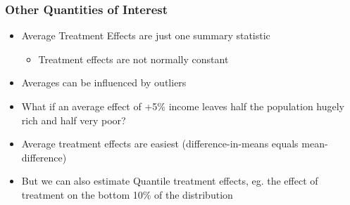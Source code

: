 \documentclass[xcolor=x11names,compress]{beamer}\usepackage[]{graphicx}\usepackage[]{color}
\renewcommand{\(}{\begin{columns}}
\renewcommand{\)}{\end{columns}}
\newcommand{\<}[1]{\begin{column}{#1}}
\renewcommand{\>}{\end{column}}
\begin{document}
\begin{frame}
\frametitle{Other Quantities of Interest}
\begin{itemize}
\item Average Treatment Effects are just one summary statistic
\begin{itemize}
\item Treatment effects are not normally constant
\end{itemize}
\pause
\item Averages can be influenced by outliers
\pause
\item What if an average effect of +5\% income leaves half the population hugely rich and half very poor?
\pause
\item Average treatment effects are easiest (difference-in-means equals mean-difference)
\pause
\item But we can also estimate Quantile treatment effects, eg. the effect of treatment on the bottom 10\% of the distribution
\end{itemize}
\end{frame}
\end{document}
